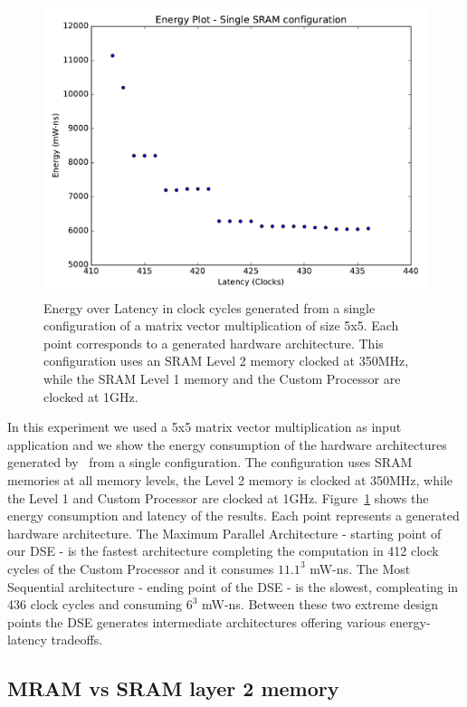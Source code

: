 \begin{figure}[tb] 
\centering
\includegraphics[width=\columnwidth]{graphs/energy_plot_single_sram.pdf}
\caption{\small Energy over Latency in clock cycles generated from a single configuration of a matrix vector multiplication of size 5x5. Each point corresponds to a generated hardware architecture. This configuration uses an SRAM Level 2 memory clocked at 350MHz, while the SRAM Level 1 memory and the Custom Processor are clocked at 1GHz.}
\label{fig:single_sram}
\end{figure}
In this experiment we used a 5x5 matrix vector multiplication as input application and we show the energy consumption of the hardware architectures generated by \frameworkname~from a single configuration. The configuration uses SRAM memories at all memory levels, the Level 2 memory is clocked at 350MHz, while the Level 1 and Custom Processor are clocked at 1GHz. Figure~\ref{fig:single_sram} shows the energy consumption and latency of the results. Each point represents a generated hardware architecture. The Maximum Parallel Architecture - starting point of our DSE - is the fastest architecture completing the computation in 412 clock cycles of the Custom Processor and it consumes $11.1^3$ mW-ns. The Most Sequential architecture - ending point of the DSE - is the slowest, compleating in 436 clock cycles and consuming $6^3$ mW-ns. Between these two extreme design points the DSE generates intermediate architectures offering various energy-latency tradeoffs. 


\subsection{MRAM vs SRAM layer 2 memory}

